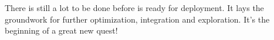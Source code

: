 There is still a lot to be done before \magnethical{} is ready for deployment. It lays the groundwork for further optimization, integration and exploration. It's the beginning of a great new quest!

